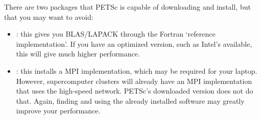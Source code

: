 \begin{remark}
  There are two packages that PETSc is capable of downloading and install,
  but that you may want to avoid:
  \begin{itemize}
  \item {}: this gives you BLAS/LAPACK through the
    Fortran `reference implementation'. If you have an optimized
    version, such as Intel's  available, this will give
    much higher performance.
  \item {}: this installs a MPI implementation, which may be
    required for your laptop. However, supercomputer clusters will
    already have an MPI implementation that uses the high-speed
    network. PETSc's downloaded version does not do that. Again,
    finding and using the already installed software may greatly
    improve your performance.
  \end{itemize}
\end{remark}
